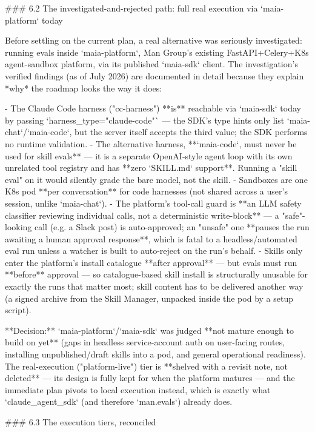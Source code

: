 ### 6.2 The investigated-and-rejected path: full real execution via `maia-platform` today

Before settling on the current plan, a real alternative was seriously investigated: running evals inside `maia-platform`, Man Group's existing FastAPI+Celery+K8s agent-sandbox platform, via its published `maia-sdk` client. The investigation's verified findings (as of July 2026) are documented in detail because they explain *why* the roadmap looks the way it does:

- The Claude Code harness ("cc-harness") **is** reachable via `maia-sdk` today by passing `harness_type="claude-code"` — the SDK's type hints only list `maia-chat`/`maia-code`, but the server itself accepts the third value; the SDK performs no runtime validation.
- The alternative harness, **`maia-code`, must never be used for skill evals** — it is a separate OpenAI-style agent loop with its own unrelated tool registry and has **zero `SKILL.md` support**. Running a "skill eval" on it would silently grade the bare model, not the skill.
- Sandboxes are one K8s pod **per conversation** for code harnesses (not shared across a user's session, unlike `maia-chat`).
- The platform's tool-call guard is **an LLM safety classifier reviewing individual calls, not a deterministic write-block** — a "safe"-looking call (e.g. a Slack post) is auto-approved; an "unsafe" one **pauses the run awaiting a human approval response**, which is fatal to a headless/automated eval run unless a watcher is built to auto-reject on the run's behalf.
- Skills only enter the platform's install catalogue **after approval** — but evals must run **before** approval — so catalogue-based skill install is structurally unusable for exactly the runs that matter most; skill content has to be delivered another way (a signed archive from the Skill Manager, unpacked inside the pod by a setup script).

**Decision:** `maia-platform`/`maia-sdk` was judged **not mature enough to build on yet** (gaps in headless service-account auth on user-facing routes, installing unpublished/draft skills into a pod, and general operational readiness). The real-execution ("platform-live") tier is **shelved with a revisit note, not deleted** — its design is fully kept for when the platform matures — and the immediate plan pivots to local execution instead, which is exactly what `claude_agent_sdk` (and therefore `man.evals`) already does.

### 6.3 The execution tiers, reconciled

